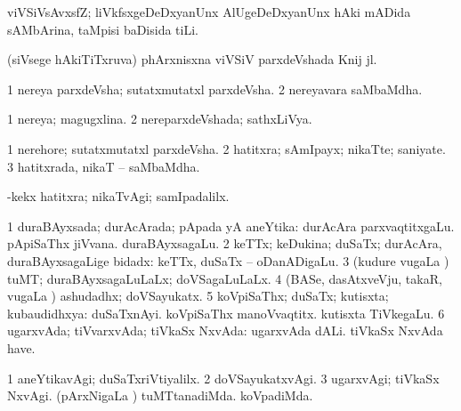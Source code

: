 {{{{{\bentry
{} 
\gl{\nA}
\expl{}
\bmng
 viVSiVsAvxsfZ; liVkfsxgeDeDxyanUnx AlUgeDeDxyanUnx hAki mADida sAMbArina, taMpisi baDisida tiLi. 
\emng
\eentry

\bentry
{} 
\gl{\nA}
\expl{}
\bmng
 (siVsege hAkiTiTxruva) phArxnisxna viVSiV parxdeVshada Knij jl. 
\emng
\eentry

\bentry
{} 
\gl{\nA}
\expl{}
\bmng
\bnum
\num{1} nereya parxdeVsha; sutatxmutatxl parxdeVsha. 
\num{2} nereyavara saMbaMdha. 
\enum
\emng
\eentry

\bentry
{} 
\gl{\gu}
\expl{}
\bmng
\bnum
\num{1} nereya; magugxlina. 
\num{2} nereparxdeVshada; sathxLiVya. 
\enum
\emng
\eentry

\bentry
{} 
\gl{\nA}
\bmng
\bnum
\num{1} nerehore; sutatxmutatxl parxdeVsha. 
\num{2} hatitxra; sAmIpayx; nikaTte; saniyate. 
\num{3} hatitxrada, nikaT -- saMbaMdha. 
\enum
\emng

\noindent 
\gl{\pagu}
\expl{}
\bmng
  -kekx\eng{)} hatitxra; nikaTvAgi; samIpadalilx. 
\emng
\eentry

\bentry 
{} 
\gl{\gu}
\expl{}
\bmng
\bnum
\num{1} duraBAyxsada; durAcArada; pApada yA aneYtika:  durAcAra parxvaqtitxgaLu.  pApiSaThx jiVvana.  duraBAyxsagaLu. 
\num{2} keTTx; keDukina; duSaTx; durAcAra, duraBAyxsagaLige bidadx:  keTTx, duSaTx -- oDanADigaLu. 
\num{3} (kudure \mo vugaLa \vi) tuMT; duraBAyxsagaLuLaLx; doVSagaLuLaLx. 
\num{4} (BASe, dasAtxveVju, takaR, \mo vugaLa \vi) ashudadhx; doVSayukatx. 
\num{5} koVpiSaThx; duSaTx; kutisxta; kubaudidhxya:  duSaTxnAyi.  koVpiSaThx manoVvaqtitx.  kutisxta TiVkegaLu. 
\num{6} ugarxvAda; tiVvarxvAda; tiVkaSx NxvAda:  ugarxvAda dALi.  tiVkaSx NxvAda have. 
\enum
\emng
\eentry

\bentry
{}
\gl{\nA}
\expl{}
\bmng
\emng
\eentry

\bentry
{} 
\gl{\kirxvi}
\expl{}
\bmng
\bnum
\num{1} aneYtikavAgi; duSaTxriVtiyalilx. 
\num{2} doVSayukatxvAgi. 
\num{3} ugarxvAgi; tiVkaSx NxvAgi. 
 (pArxNigaLa \vi) 
\banum
{} tuMTtanadiMda. 
 koVpadiMda. 
\eanum
\numie
\enum
\emng
\eentry

}}}}}
